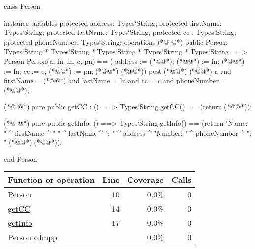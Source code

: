\begin{vdmpp}[breaklines=true]
class Person

instance variables
  protected address: Types`String;
  protected firstName: Types`String;
  protected lastName: Types`String;
  protected cc : Types`String;
  protected phoneNumber: Types`String;
operations
(*@
\label{Person:10}
@*)
 public Person: Types`String * Types`String * Types`String * Types`String * Types`String ==> Person
  Person(a, fn, ln, c, pn) == ( address := (*@@*); (*@@*) := fn; (*@@*) := ln; cc := c; (*@@*) := pn; (*@@*) (*@@*))
 post (*@@*) (*@\vdmnotcovered{=}@*) a and firstName = (*@@*) and lastName = ln and cc = c and phoneNumber = (*@@*);
  
(*@
\label{getCC:14}
@*)
 pure public getCC : () ==> Types`String
  getCC() == (return (*@@*));
  
(*@
\label{getInfo:17}
@*)
 pure public getInfo: () ==> Types`String
  getInfo() == (return "Name: " ^ firstName ^ " " ^ lastName ^ "\nAddress: " ^ address ^ "\nPhone Number: " ^ phoneNumber ^ "\nCC: " (*@\vdmnotcovered{\^{}}@*) (*@@*));

end Person
\end{vdmpp}
\bigskip
\begin{longtable}{|l|r|r|r|}
\hline
Function or operation & Line & Coverage & Calls \\
\hline
\hline
\hyperref[Person:10]{Person} & 10&0.0\% & 0 \\
\hline
\hyperref[getCC:14]{getCC} & 14&0.0\% & 0 \\
\hline
\hyperref[getInfo:17]{getInfo} & 17&0.0\% & 0 \\
\hline
\hline
Person.vdmpp & & 0.0\% & 0 \\
\hline
\end{longtable}


